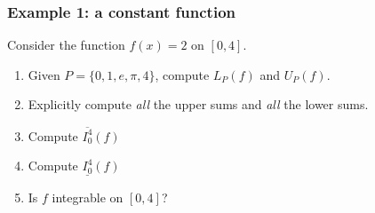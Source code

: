 \documentclass[14pt]{beamer}
\begin{document}
\begin{frame}[t]
	\fontsize{13}{13}\selectfont
	\frametitle{Example 1: a constant function}

	Consider the function \; $f(x)=2$ \; on \; $[0,4]$.
	\vspace{.2cm}

	\begin{enumerate}
		\item Given $\displaystyle P =\{ 0, 1, e, \pi, 4 \}$, compute
			$\displaystyle L_{P}(f)$ and $\displaystyle U_{P}(f)$.

		\item Explicitly compute \emph{all} the upper sums and \emph{all} the lower sums.
			\vspace{.2cm}

		\item Compute $\displaystyle \overline{I_0^4}(f)$
			\vspace{.2cm}

		\item Compute $\displaystyle \underline{I_0^4}(f)$
			\vspace{.2cm}

		\item Is $f$ integrable on $[0,4]$?
	\end{enumerate}
\end{frame}
\end{document}
